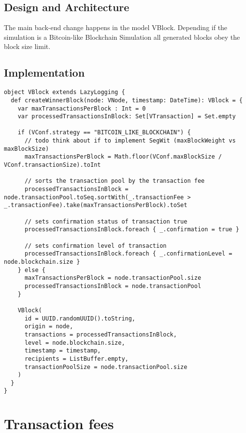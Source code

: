 \subsection{Design and Architecture}
The main back-end change happens in the model VBlock. Depending if the simulation is a Bitcoin-like Blockchain Simulation all generated blocks obey the block size limit. 

\subsection{Implementation}

\begin{minipage}{\linewidth}
\begin{lstlisting}[style=myScalastyle]
object VBlock extends LazyLogging {
  def createWinnerBlock(node: VNode, timestamp: DateTime): VBlock = {
    var maxTransactionsPerBlock : Int = 0
    var processedTransactionsInBlock: Set[VTransaction] = Set.empty

    if (VConf.strategy == "BITCOIN_LIKE_BLOCKCHAIN") {
      // todo think about if to implement SegWit (maxBlockWeight vs maxBlockSize)
      maxTransactionsPerBlock = Math.floor(VConf.maxBlockSize / VConf.transactionSize).toInt

      // sorts the transaction pool by the transaction fee
      processedTransactionsInBlock = node.transactionPool.toSeq.sortWith(_.transactionFee > _.transactionFee).take(maxTransactionsPerBlock).toSet

      // sets confirmation status of transaction true
      processedTransactionsInBlock.foreach { _.confirmation = true }

      // sets confirmation level of transaction
      processedTransactionsInBlock.foreach { _.confirmationLevel = node.blockchain.size }
    } else {
      maxTransactionsPerBlock = node.transactionPool.size
      processedTransactionsInBlock = node.transactionPool
    }

    VBlock(
      id = UUID.randomUUID().toString,
      origin = node,
      transactions = processedTransactionsInBlock,
      level = node.blockchain.size,
      timestamp = timestamp,
      recipients = ListBuffer.empty,
      transactionPoolSize = node.transactionPool.size
    )
  }
}
\end{lstlisting}
\end{minipage}

\section{Transaction fees}

